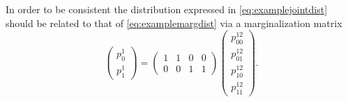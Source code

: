 In order to be consistent the distribution expressed in \autoref{eq:examplejointdist} should be related to that of \autoref{eq:examplemargdist} via a marginalization matrix
\begin{equation}
\begin{pmatrix}
p^{1}_{0}\\
p^{1}_{1}
\end{pmatrix} = \begin{pmatrix}
1 & 1 & 0 & 0\\
0 & 0 & 1 & 1
\end{pmatrix}
\begin{pmatrix}
p^{12}_{00}\\
p^{12}_{01}\\
p^{12}_{10}\\
p^{12}_{11}
\end{pmatrix}.
\end{equation}

